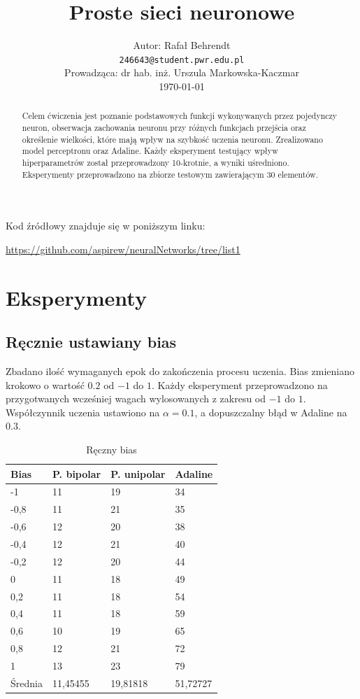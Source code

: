 \documentclass{article}
\title{ Proste sieci neuronowe }
\author{
  Autor: Rafał Behrendt \\
  \texttt{246643@student.pwr.edu.pl} \\
  Prowadząca: dr hab. inż. Urszula Markowska-Kaczmar \\
  \today
}
\begin{document}
\maketitle

\begin{abstract}
  Celem ćwiczenia jest poznanie podstawowych funkcji wykonywanych przez pojedynczy neuron,
  obserwacja zachowania neuronu przy różnych funkcjach przejścia oraz określenie wielkości, 
  które mają wpływ na szybkość uczenia neuronu. Zrealizowano model perceptronu oraz Adaline.
  Każdy eksperyment testujący wpływ hiperparametrów został przeprowadzony 10-krotnie,
  a wyniki uśredniono. Eksperymenty przeprowadzono na zbiorze testowym zawierającym 30 elementów.
\end{abstract}

Kod źródłowy znajduje się w poniższym linku:

\begin{center}
  \url{https://github.com/aspirew/neuralNetworks/tree/list1}
\end{center}

\newpage
\section{Eksperymenty}

\subsection{Ręcznie ustawiany bias}

Zbadano ilość wymaganych epok do zakończenia procesu uczenia.
Bias zmieniano krokowo o wartość $0.2$ od $-1$ do $1$. Każdy eksperyment przeprowadzono na przygotwanych
wcześniej wagach wylosowanych z zakresu od $-1$ do $1$. Współczynnik uczenia ustawiono na $\alpha = 0.1$,
a dopuszczalny błąd w Adaline na $0.3$.

\begin{table}[h]
  \centering
    
  \bgroup
  \def\arraystretch{1.3}
  \begin{tabular}{|l|l|l|l|}
  \hline
  Bias & P. bipolar & P. unipolar & Adaline  \\ \hline
  -1 & 11 & 19 & 34 \\ \hline
  -0,8 & 11 & 21 & 35 \\ \hline
  -0,6 & 12 & 20 & 38 \\ \hline
  -0,4 & 12 & 21 & 40 \\ \hline
  -0,2 & 12 & 20 & 44 \\ \hline
  0 & 11 & 18 & 49 \\ \hline
  0,2 & 11 & 18 & 54 \\ \hline
  0,4 & 11 & 18 & 59 \\ \hline
  0,6 & 10 & 19 & 65 \\ \hline
  0,8 & 12 & 21 & 72 \\ \hline
  1 & 13 & 23 & 79 \\ \hline
  Średnia & 11,45455 & 19,81818 & 51,72727 \\ \hline
  \end{tabular}
  \egroup
  \vspace{10px}
  \caption{Ręczny bias}
\end{table}
\end{document}
